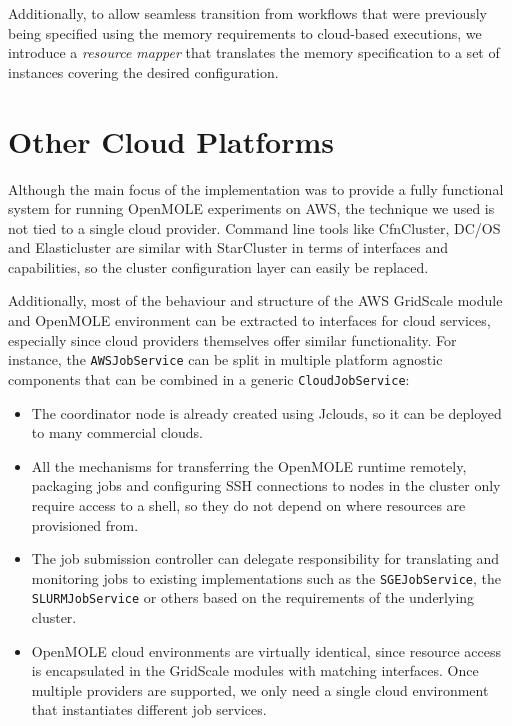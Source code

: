 Additionally, to allow seamless transition from workflows that were previously being specified using the memory requirements to cloud-based executions, we introduce a \textit{resource mapper} that translates the memory specification to a set of instances covering the desired configuration.

\section{Other Cloud Platforms}

Although the main focus of the implementation was to provide a fully functional system for running OpenMOLE experiments on AWS, the technique we used is not tied to a single cloud provider. Command line tools like CfnCluster, DC/OS and Elasticluster are similar with StarCluster in terms of interfaces and capabilities, so the cluster configuration layer can easily be replaced.

Additionally, most of the behaviour and structure of the AWS GridScale module and OpenMOLE environment can be extracted to interfaces for cloud services, especially since cloud providers themselves offer similar functionality. For instance, the \verb|AWSJobService| can be split in multiple platform agnostic components that can be combined in a generic \verb|CloudJobService|:

\begin{itemize}
	\item The coordinator node is already created using Jclouds, so it can be deployed to many commercial clouds.
	\item All the mechanisms for transferring the OpenMOLE runtime remotely, packaging jobs and configuring SSH connections to nodes in the cluster only require access to a shell, so they do not depend on where resources are provisioned from.
	\item The job submission controller can delegate responsibility for translating and monitoring jobs to existing implementations such as the \verb|SGEJobService|, the \verb|SLURMJobService| or others based on the requirements of the underlying cluster.
	\item OpenMOLE cloud environments are virtually identical, since resource access is encapsulated in the GridScale modules with matching interfaces. Once multiple providers are supported, we only need a single cloud environment that instantiates different job services.
\end{itemize}

\vspace{-1mm}
